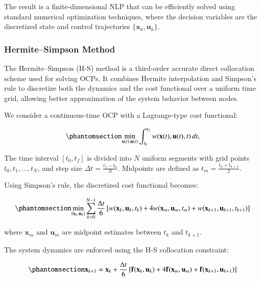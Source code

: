\documentclass[
  number,
  preprint]{elsarticle}
\begin{document}
The result is a finite-dimensional NLP that can be efficiently solved
using standard numerical optimization techniques, where the decision
variables are the discretized state and control trajectories
\(\{ \mathbf{x}_k, \mathbf{u}_k \}\).

\subsubsection{Hermite--Simpson Method}\label{hermitesimpson-method}

The Hermite--Simpson (H-S) method is a third-order accurate direct
collocation scheme used for solving OCPs. It combines Hermite
interpolation and Simpson's rule to discretize both the dynamics and the
cost functional over a uniform time grid, allowing better approximation
of the system behavior between nodes.

We consider a continuous-time OCP with a Lagrange-type cost functional:

\begin{equation}\protect\phantomsection\label{eq-ch2-hs-cont-cost}{
\min_{\mathbf{x}(t), \mathbf{u}(t)} \int_{t_0}^{t_f} w(\mathbf{x}(t), \mathbf{u}(t), t) \, dt,
}\end{equation}

The time interval \([t_0, t_f]\) is divided into \(N\) uniform segments
with grid points \(t_0, t_1, \ldots, t_N\), and step size
\(\Delta t = \frac{t_f - t_0}{N}\). Midpoints are defined as
\(t_m = \frac{t_k + t_{k+1}}{2}\).

Using Simpson's rule, the discretized cost functional becomes:

\begin{equation}\protect\phantomsection\label{eq-ch2-hs-disc-cost}{
\min_{\{\mathbf{x}_k, \mathbf{u}_k\}} \sum_{k=0}^{N-1} \frac{\Delta t}{6} \left[ w(\mathbf{x}_k, \mathbf{u}_k, t_k) + 4 w(\mathbf{x}_m, \mathbf{u}_m, t_m) + w(\mathbf{x}_{k+1}, \mathbf{u}_{k+1}, t_{k+1}) \right]
}\end{equation}

where \(\mathbf{x}_m\) and \(\mathbf{u}_m\) are midpoint estimates
between \(t_k\) and \(t_{k+1}\).

The system dynamics are enforced using the H-S collocation constraint:

\begin{equation}\protect\phantomsection\label{eq-ch2-hs-dynamics}{
\mathbf{x}_{k+1} = \mathbf{x}_k + \frac{\Delta t}{6} \left[ \mathbf{f}(\mathbf{x}_k, \mathbf{u}_k) + 4 \mathbf{f}(\mathbf{x}_m, \mathbf{u}_m) + \mathbf{f}(\mathbf{x}_{k+1}, \mathbf{u}_{k+1}) \right]
}\end{equation}
\end{document}
